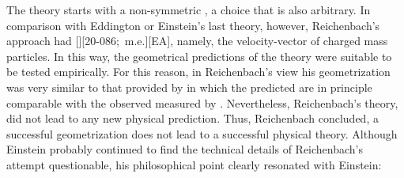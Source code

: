 \documentclass[draft]{article}
\renewcommand{\me}{;~m.e.{}}
\begin{document}


The theory starts with a non-symmetric \Gtmn, a choice that is also arbitrary. In comparison with Eddington or Einstein's last theory, however, Reichenbach's approach had [][20-086\me][EA], namely, the velocity-vector of charged mass particles. In this way, the geometrical predictions of the theory were suitable to be tested empirically. For this reason, in Reichenbach's view his geometrization was very similar to that provided by \gr in which the predicted \gmn are in principle comparable with the observed \gmn measured by \rac. Nevertheless, Reichenbach's theory, did not lead to any new physical prediction. Thus, Reichenbach concluded, a successful geometrization does not lead to a successful physical theory. Although Einstein probably continued to find the technical details of Reichenbach's attempt questionable, his philosophical point clearly resonated with Einstein:
\end{document}
